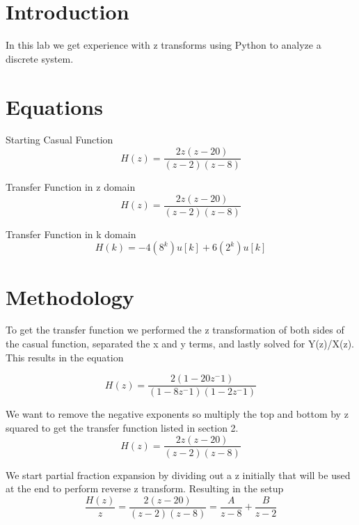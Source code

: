 \documentclass[12pt]{report}
\begin{document}
\section{Introduction}
 

In this lab we get experience with z transforms using Python to analyze a discrete system.

\section{Equations}
Starting Casual Function
\begin{equation*}
H(z) = \frac{2z(z-20)}{(z-2)(z-8)}
\end{equation*}

Transfer Function in z domain
\begin{equation*}
H(z) = \frac{2z(z-20)}{(z-2)(z-8)}
\end{equation*}

Transfer Function in k domain
\begin{equation*}
H(k) = -4(8^k)u[k] + 6(2^k)u[k]
\end{equation*}



\section{Methodology}

To get the transfer function we performed the z transformation of both sides of the casual function, separated the x and y terms, and lastly solved for Y(z)/X(z). This results in the equation

\begin{equation*}
H(z) = \frac{2(1-20z^-1 )}{(1-8z^-1) (1-2z^-1 )}
\end{equation*}

We want to remove the negative exponents so multiply the top and bottom by z squared to get the transfer function listed in section 2. 
\begin{equation*}
H(z) = \frac{2z(z-20)}{(z-2)(z-8)}
\end{equation*}

We start partial fraction expansion by dividing out a z initially that will be used at the end to perform reverse z transform. Resulting in the setup
\begin{equation*}
    \frac{H(z)}{z} = \frac{2(z-20)}{(z-2)(z-8)} = \frac{A}{z-8} + \frac{B}{z-2}
\end{equation*}
\end{document}
